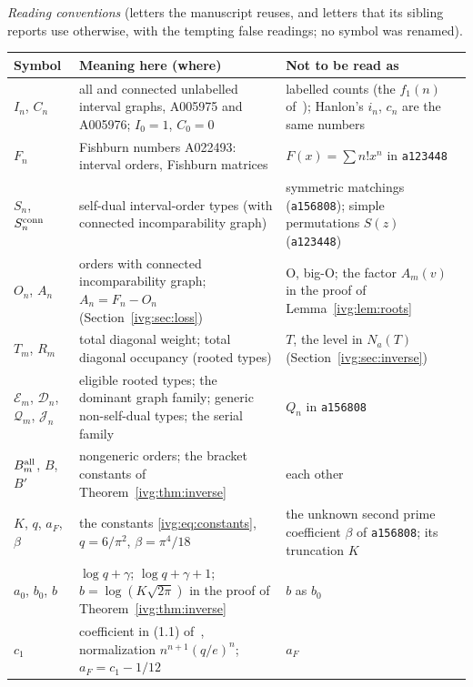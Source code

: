 \documentclass[11pt,letterpaper]{article}
\theoremstyle{definition}\newtheorem{definition}[theorem]{Definition}
\theoremstyle{remark}\newtheorem{remark}[theorem]{Remark}
\newcommand{\OO}{\mathrm O}
\newcommand{\file}[1]{\nolinkurl{#1}}
\begin{document}
\medskip\noindent\begin{minipage}{\textwidth}
\emph{Reading conventions} (letters the manuscript reuses, and letters that
its sibling reports use otherwise, with the tempting false readings; no
symbol was renamed).

\smallskip
\begingroup\small\renewcommand{\arraystretch}{1.1}
\noindent\begin{tabular}{@{}>{\raggedright\arraybackslash}p{0.85in}>{\raggedright\arraybackslash}p{3.35in}>{\raggedright\arraybackslash}p{1.95in}@{}}
\toprule
Symbol & Meaning here (where) & Not to be read as\\
\midrule
$I_n$, $C_n$ & all and connected unlabelled interval graphs, A005975 and
 A005976; $I_0=1$, $C_0=0$ & labelled counts (the $f_1(n)$ of~\cite{BJ});
 Hanlon's $i_n$, $c_n$ are the same numbers\\
$F_n$ & Fishburn numbers A022493: interval orders, Fishburn matrices &
 $F(x)=\sum n!x^n$ in \file{a123448}\\
$S_n$, $S_n^{\rm conn}$ & self-dual interval-order types (with connected
 incomparability graph) & symmetric matchings (\file{a156808}); simple
 permutations $S(z)$ (\file{a123448})\\
$O_n$, $A_n$ & orders with connected incomparability graph; $A_n=F_n-O_n$
 (Section~\ref{ivg:sec:loss}) & $\OO$, big-O; the factor $A_m(v)$ in the
 proof of Lemma~\ref{ivg:lem:roots}\\
$T_m$, $R_m$ & total diagonal weight; total diagonal occupancy (rooted
 types) & $T$, the level in $N_a(T)$ (Section~\ref{ivg:sec:inverse})\\
$\mathcal E_m$, $\mathcal D_n$, $\mathcal Q_m$, $\mathcal J_n$ & eligible
 rooted types; the dominant graph family; generic non-self-dual types; the
 serial family & $Q_n$ in \file{a156808}\\
$B_m^{\rm all}$, $B$, $B'$ & nongeneric orders; the bracket constants of
 Theorem~\ref{ivg:thm:inverse} & each other\\
$K$, $q$, $a_F$, $\beta$ & the constants \eqref{ivg:eq:constants},
 $q=6/\pi^2$, $\beta=\pi^4/18$ & the unknown second prime coefficient
 $\beta$ of \file{a156808}; its truncation $K$\\
$a_0$, $b_0$, $b$ & $\log q+\gamma$; $\log q+\gamma+1$; $b=\log(K\sqrt{2\pi})$
 in the proof of Theorem~\ref{ivg:thm:inverse} & $b$ as $b_0$\\
$c_1$ & coefficient in (1.1) of~\cite{HJ}, normalization $n^{n+1}(q/e)^n$;
 $a_F=c_1-1/12$ & $a_F$\\

\end{tabular}
\end{minipage}
\end{document}
